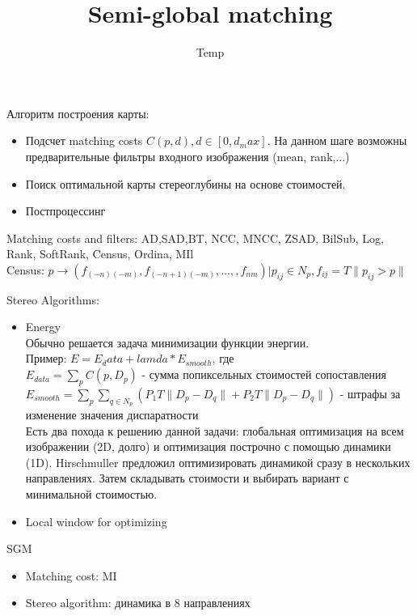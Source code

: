 \documentclass[14pt]{article} %
\title{Semi-global matching}
\author{Temp}
\date{}
\begin{document}
\maketitle

Алгоритм построения карты:
\begin{itemize}
 \item Подсчет matching costs $C(p,d), d \in [0, d_max]$. На данном шаге возможны предварительные фильтры входного изображения (mean, rank,...)
 \item Поиск оптимальной карты стереоглубины на основе стоимостей. 
 \item Постпроцессинг
\end{itemize} 


Matching costs and filters: AD,SAD,BT, NCC, MNCC, ZSAD, BilSub, Log, Rank, SoftRank, Census, Ordina, MIl \\
Census: $ p \to (f_{(-n)(-m)}, f_{(-n+1)(-m)}, ...,,  f_{nm})| p_{ij} \in N_p,  f_{ij} = T \| p_{ij} > p \| $

Stereo Algorithms:
\begin{itemize}
\item Energy \\
    Обычно решается задача минимизации функции энергии. \\
     Пример: $E = E_data  + lamda * E_{smooth} $,  где  \\
     $ E_{data} = \sum_p C(p, D_p) $ -  сумма попиксельных стоимостей сопоставления \\
      $E_{smooth} = \sum_{p} \sum_{q \in N_p}(P_1 T \|D_p-D_q\| + P_2 T\|D_p -D_q\|)$ -  штрафы за изменение значения диспаратности\\
   Есть два похода к решению данной задачи: глобальная оптимизация на всем изображении (2D, долго) и оптимизация построчно с помощью динамики (1D). Hirschmuller  предложил оптимизировать динамикой сразу в нескольких направлениях. Затем складывать стоимости и выбирать вариант с минимальной стоимостью.
\item Local window for optimizing
\end{itemize}

SGM
\begin{itemize}
 \item Matching cost: MI 
 \item Stereo algorithm: динамика в 8 направлениях
\end{itemize} 
\end{document}
